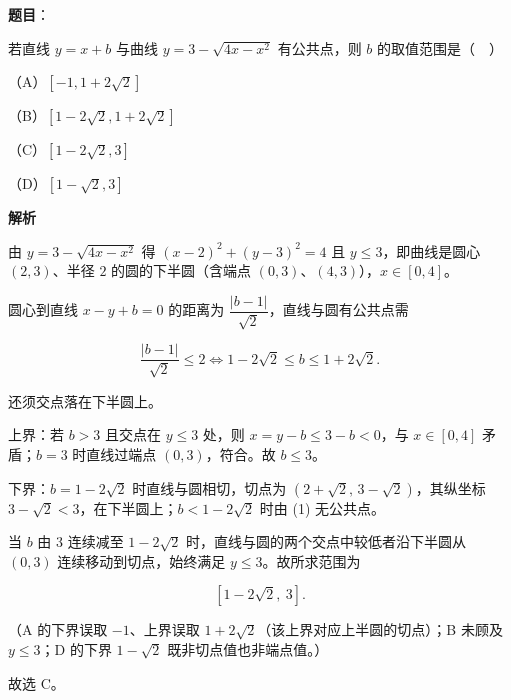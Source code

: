 \begin{answer}

\textbf{题目}：

若直线 $y=x+b$ 与曲线 $y=3-\sqrt{4x-x^2}$ 有公共点，则 $b$ 的取值范围是（　）

（A）$[-1,1+2\sqrt2]$

（B）$[1-2\sqrt2,1+2\sqrt2]$

（C）$[1-2\sqrt2,3]$

（D）$[1-\sqrt2,3]$

\textbf{解析}

由 $y=3-\sqrt{4x-x^2}$ 得 $(x-2)^2+(y-3)^2=4$ 且 $y\leqslant3$，即曲线是圆心 $(2,3)$、半径 $2$ 的圆的下半圆（含端点 $(0,3)$、$(4,3)$），$x\in[0,4]$。

圆心到直线 $x-y+b=0$ 的距离为 $\dfrac{|b-1|}{\sqrt2}$，直线与圆有公共点需

\nopagebreak[4]
\[\frac{|b-1|}{\sqrt2}\leqslant2\iff 1-2\sqrt2\leqslant b\leqslant1+2\sqrt2. \tag{1}\]

还须交点落在下半圆上。

上界：若 $b>3$ 且交点在 $y\leqslant3$ 处，则 $x=y-b\leqslant3-b<0$，与 $x\in[0,4]$ 矛盾；$b=3$ 时直线过端点 $(0,3)$，符合。故 $b\leqslant3$。

下界：$b=1-2\sqrt2$ 时直线与圆相切，切点为 $\left(2+\sqrt2,\,3-\sqrt2\right)$，其纵坐标 $3-\sqrt2<3$，在下半圆上；$b<1-2\sqrt2$ 时由 (1) 无公共点。

当 $b$ 由 $3$ 连续减至 $1-2\sqrt2$ 时，直线与圆的两个交点中较低者沿下半圆从 $(0,3)$ 连续移动到切点，始终满足 $y\leqslant3$。故所求范围为

\nopagebreak[4]
\[\left[1-2\sqrt2,\ 3\right].\]

（A 的下界误取 $-1$、上界误取 $1+2\sqrt2$（该上界对应上半圆的切点）；B 未顾及 $y\leqslant3$；D 的下界 $1-\sqrt2$ 既非切点值也非端点值。）

故选 C。


\end{answer}
